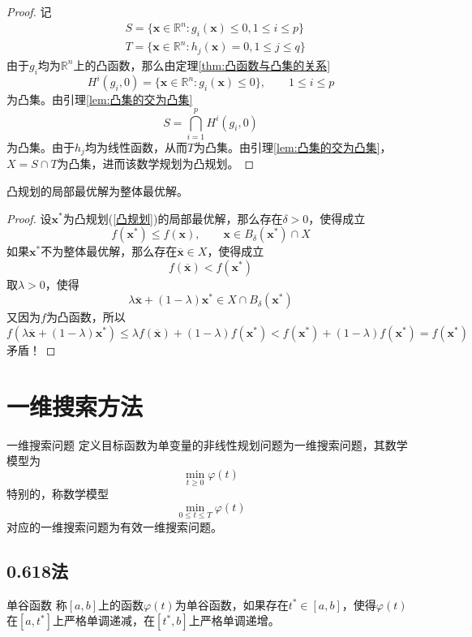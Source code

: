 \documentclass[lang = cn, scheme = chinese, thmcnt = section]{elegantbook}
\newcommand{\R}{\mathbb{R}}            %
\newcommand{\bs}{\boldsymbol}          %
\begin{document}
\begin{proof}
	记
	\begin{align*}
		& S=\{ \bs{x}\in\R^n:g_i(\bs{x})\le 0,1\le i \le p \}\\
		& T=\{ \bs{x}\in\R^n:h_j(\bs{x}) = 0,1\le j \le q \}
	\end{align*}
	由于$g_i$均为$\R^n$上的凸函数，那么由定理\ref{thm:凸函数与凸集的关系}
	$$
	H^i(g_i,0)=\{ \bs{x}\in\R^n:g_i(\bs{x})\le 0 \},\qquad 1\le  i \le p
	$$
	为凸集。由引理\ref{lem:凸集的交为凸集}
	$$
	S=\bigcap_{i=1}^{p}H^i(g_i,0)
	$$
	为凸集。由于$h_j$均为线性函数，从而$T$为凸集。由引理\ref{lem:凸集的交为凸集}，$X=S\cap T$为凸集，进而该数学规划为凸规划。
\end{proof}

\begin{theorem}
	凸规划的局部最优解为整体最优解。
\end{theorem}

\begin{proof}
	设$\bs{x}^*$为凸规划(\ref{凸规划})的局部最优解，那么存在$\delta>0$，使得成立
	$$
	f(\bs{x}^*)\le f(\bs{x}),\qquad
	\bs{x}\in B_{\delta}(\bs{x}^*)\cap X
	$$
	如果$\bs{x}^*$不为整体最优解，那么存在$\overline{\bs{x}}\in X$，使得成立
	$$
	f(\overline{\bs{x}})<f(\bs{x}^*)
	$$
	取$\lambda>0$，使得
	$$
	\lambda\overline{\bs{x}}+(1-\lambda)\bs{x}^*\in X\cap B_\delta(\bs{x}^*)
	$$
	又因为$f$为凸函数，所以
	$$
	f(\lambda\overline{\bs{x}}+(1-\lambda)\bs{x}^*)
	\le \lambda f(\overline{\bs{x}})+(1-\lambda)f(\bs{x}^*)
	<f(\bs{x}^*)+(1-\lambda)f(\bs{x}^*)
	=f(\bs{x}^*)
	$$
	矛盾！
\end{proof}

\section{一维搜索方法}

\begin{definition}{一维搜索问题}
	定义目标函数为单变量的非线性规划问题为一维搜索问题，其数学模型为
	$$
	\min_{t\ge 0}\varphi(t)
	$$
	特别的，称数学模型
	$$
	\min_{0\le t \le T}\varphi(t)
	$$
	对应的一维搜索问题为有效一维搜索问题。
\end{definition}

\subsection{0.618法}

\begin{definition}{单谷函数}
	称$[a,b]$上的函数$\varphi(t)$为单谷函数，如果存在$t^*\in [a,b]$，使得$\varphi(t)$在$[a,t^*]$上严格单调递减，在$[t^*,b]$上严格单调递增。
\end{definition}
\end{document}
